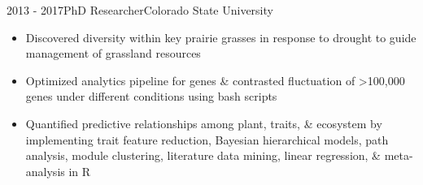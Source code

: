 \documentclass[letterpaper]{twentysecondcv} %
\begin{document}
\begin{twenty}
       \twentyitem
    	{2013 - }{2017}{PhD Researcher}{Colorado State University}
        	{}
        { \vspace{-1mm}
        {\begin{itemize}
        \item Discovered diversity within key prairie grasses in response to drought to guide management of grassland resources 
       \vspace{1mm} 
	\item Optimized analytics pipeline for genes \& contrasted fluctuation of >100,000 genes under different conditions using bash scripts
	\vspace{1mm} 
	\item Quantified predictive relationships among plant, traits, \& ecosystem by implementing trait feature reduction, Bayesian hierarchical models, path analysis, module clustering, literature data mining, linear regression, \& meta-analysis in R
    \end{itemize}}  \vspace{6mm}  }



                
\end{twenty}


%
\end{document}
